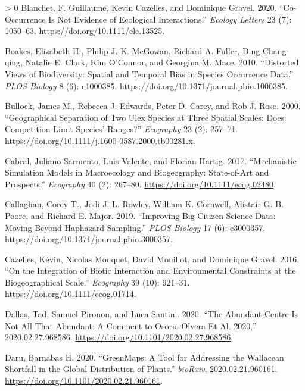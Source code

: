 \documentclass[11pt]{article}
\newlength{\cslhangindent}
\newenvironment{CSLReferences}[3] %
 {%
  \setlength{\parindent}{0pt}
  \ifodd #1 \everypar{\setlength{\hangindent}{\cslhangindent}}\ignorespaces\fi
  \ifnum #2 > 0
  \setlength{\parskip}{#2\baselineskip}
  \fi
 }%
 {}
\begin{document}
\begin{CSLReferences}{1}{0}
\leavevmode\hypertarget{ref-Blanchet2020CooNot}{}%
Blanchet, F. Guillaume, Kevin Cazelles, and Dominique Gravel. 2020.
{``Co-Occurrence Is Not Evidence of Ecological Interactions.''}
\emph{Ecology Letters} 23 (7): 1050--63.
\url{https://doi.org/10.1111/ele.13525}.

\leavevmode\hypertarget{ref-Boakes2010DisVie}{}%
Boakes, Elizabeth H., Philip J. K. McGowan, Richard A. Fuller, Ding
Chang-qing, Natalie E. Clark, Kim O'Connor, and Georgina M. Mace. 2010.
{``Distorted Views of Biodiversity: Spatial and Temporal Bias in Species
Occurrence Data.''} \emph{PLOS Biology} 8 (6): e1000385.
\url{https://doi.org/10.1371/journal.pbio.1000385}.

\leavevmode\hypertarget{ref-Bullock2000GeoSep}{}%
Bullock, James M., Rebecca J. Edwards, Peter D. Carey, and Rob J. Rose.
2000. {``Geographical Separation of Two Ulex Species at Three Spatial
Scales: Does Competition Limit Species' Ranges?''} \emph{Ecography} 23
(2): 257--71. \url{https://doi.org/10.1111/j.1600-0587.2000.tb00281.x}.

\leavevmode\hypertarget{ref-Cabral2017MecSim}{}%
Cabral, Juliano Sarmento, Luis Valente, and Florian Hartig. 2017.
{``Mechanistic Simulation Models in Macroecology and Biogeography:
State-of-Art and Prospects.''} \emph{Ecography} 40 (2): 267--80.
\url{https://doi.org/10.1111/ecog.02480}.

\leavevmode\hypertarget{ref-Callaghan2019ImpBig}{}%
Callaghan, Corey T., Jodi J. L. Rowley, William K. Cornwell, Alistair G.
B. Poore, and Richard E. Major. 2019. {``Improving Big Citizen Science
Data: Moving Beyond Haphazard Sampling.''} \emph{PLOS Biology} 17 (6):
e3000357. \url{https://doi.org/10.1371/journal.pbio.3000357}.

\leavevmode\hypertarget{ref-Cazelles2016IntBio}{}%
Cazelles, Kévin, Nicolas Mouquet, David Mouillot, and Dominique Gravel.
2016. {``On the Integration of Biotic Interaction and Environmental
Constraints at the Biogeographical Scale.''} \emph{Ecography} 39 (10):
921--31. \url{https://doi.org/10.1111/ecog.01714}.

\leavevmode\hypertarget{ref-Dallas2020AbuNot}{}%
Dallas, Tad, Samuel Pironon, and Luca Santini. 2020. {``The
Abundant-Centre Is Not All That Abundant: A Comment to Osorio-Olvera Et
Al. 2020,''} 2020.02.27.968586.
\url{https://doi.org/10.1101/2020.02.27.968586}.

\leavevmode\hypertarget{ref-Daru2020GreToo}{}%
Daru, Barnabas H. 2020. {``GreenMaps: A Tool for Addressing the
Wallacean Shortfall in the Global Distribution of Plants.''}
\emph{bioRxiv}, 2020.02.21.960161.
\url{https://doi.org/10.1101/2020.02.21.960161}.


\end{CSLReferences}
\end{document}
